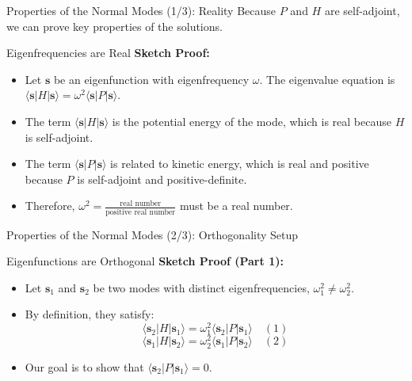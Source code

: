 \documentclass{beamer}
\begin{document}
\begin{frame}{Properties of the Normal Modes (1/3): Reality}
    Because $P$ and $H$ are self-adjoint, we can prove key properties of the solutions.
    \begin{block}{Eigenfrequencies are Real}
        \textbf{Sketch Proof:}
        \begin{itemize}
            \item Let $\mathbf{s}$ be an eigenfunction with eigenfrequency $\omega$. The eigenvalue equation is $\langle \mathbf{s}|H|\mathbf{s}\rangle = \omega^2 \langle \mathbf{s}|P|\mathbf{s}\rangle$.
            \pause
            \item The term $\langle \mathbf{s}|H|\mathbf{s}\rangle$ is the potential energy of the mode, which is real because $H$ is self-adjoint.
            \pause
            \item The term $\langle \mathbf{s}|P|\mathbf{s}\rangle$ is related to kinetic energy, which is real and positive because $P$ is self-adjoint and positive-definite.
            \pause
            \item Therefore, $\omega^2 = \frac{\text{real number}}{\text{positive real number}}$ must be a real number.
        \end{itemize}
    \end{block}
\end{frame}

\begin{frame}{Properties of the Normal Modes (2/3): Orthogonality Setup}
    \begin{block}{Eigenfunctions are Orthogonal}
        \textbf{Sketch Proof (Part 1):}
        \begin{itemize}
            \item Let $\mathbf{s}_1$ and $\mathbf{s}_2$ be two modes with distinct eigenfrequencies, $\omega_1^2 \neq \omega_2^2$.
            \pause
            \item By definition, they satisfy:
            $$ \langle \mathbf{s}_2|H|\mathbf{s}_1\rangle = \omega_1^2 \langle \mathbf{s}_2|P|\mathbf{s}_1\rangle \quad (1) $$
            \pause
            $$ \langle \mathbf{s}_1|H|\mathbf{s}_2\rangle = \omega_2^2 \langle \mathbf{s}_1|P|\mathbf{s}_2\rangle \quad (2) $$
            \pause
            \item Our goal is to show that $\langle \mathbf{s}_2|P|\mathbf{s}_1\rangle = 0$.
        \end{itemize}
    \end{block}
\end{frame}
\end{document}
